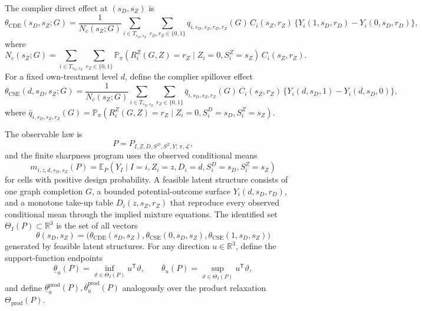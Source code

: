 \documentclass[11pt]{article}
\newcommand{\E}{\mathbb{E}}
\renewcommand{\Pr}{\mathbb{P}}
\newcommand{\transpose}{\mathsf{T}}
\newcommand{\R}{\mathbb{R}}
\theoremstyle{definition}
\theoremstyle{plain}
\theoremstyle{remark}
\begin{document}
The complier direct effect at \((s_D,s_Z)\) is
\[
\theta_{\mathrm{CDE}}(s_D,s_Z;G)
=
\frac{1}{N_c(s_Z;G)}
\sum_{i\in T_{s_D,s_Z}}
\sum_{r_D,r_Z\in\{0,1\}}
q_{i,s_D,s_Z,r_D,r_Z}(G)\,
C_i(s_Z,r_Z)\,
\{Y_i(1,s_D,r_D)-Y_i(0,s_D,r_D)\},
\]
where
\[
N_c(s_Z;G)=
\sum_{i\in T_{s_D,s_Z}}
\sum_{r_Z\in\{0,1\}}
\Pr_\pi(R_i^Z(G,Z)=r_Z\mid Z_i=0,S_i^Z=s_Z)\,C_i(s_Z,r_Z).
\]
For a fixed own-treatment level \(d\), define the complier spillover effect
\[
\theta_{\mathrm{CSE}}(d,s_D,s_Z;G)
=
\frac{1}{N_c(s_Z;G)}
\sum_{i\in T_{s_D,s_Z}}
\sum_{r_Z\in\{0,1\}}
\bar q_{i,s_D,s_Z,r_Z}(G)\,
C_i(s_Z,r_Z)\,
\{Y_i(d,s_D,1)-Y_i(d,s_D,0)\},
\]
where \(\bar q_{i,s_D,s_Z,r_Z}(G)=\Pr_\pi(R_i^Z(G,Z)=r_Z\mid Z_i=0,S_i^D=s_D,S_i^Z=s_Z)\).

The observable law is
\[
P=P_{I,Z,D,S^D,S^Z,Y;\,\pi,\mathcal L},
\]
and the finite sharpness program uses the observed conditional means
\[
m_{i,z,d,s_D,s_Z}(P)=
\E_P(Y_I\mid I=i,Z_i=z,D_i=d,S_i^D=s_D,S_i^Z=s_Z)
\]
for cells with positive design probability. A feasible latent structure consists of one graph completion \(G\), a bounded potential-outcome surface \(Y_i(d,s_D,r_D)\), and a monotone take-up table \(D_i(z,s_Z,r_Z)\) that reproduce every observed conditional mean through the implied mixture equations.
The identified set \(\Theta_I(P)\subset\R^3\) is the set of all vectors
\[
\theta(s_D,s_Z)=\big(\theta_{\mathrm{CDE}}(s_D,s_Z),\theta_{\mathrm{CSE}}(0,s_D,s_Z),\theta_{\mathrm{CSE}}(1,s_D,s_Z)\big)
\]
generated by feasible latent structures. For any direction \(u\in\R^3\), define the support-function endpoints
\[
\underline\theta_u(P)=\inf_{\vartheta\in\Theta_I(P)}u^\transpose\vartheta,
\qquad
\overline\theta_u(P)=\sup_{\vartheta\in\Theta_I(P)}u^\transpose\vartheta,
\]
and define \(\underline\theta^{\mathrm{prod}}_u(P),\overline\theta^{\mathrm{prod}}_u(P)\) analogously over the product relaxation \(\Theta_{\mathrm{prod}}(P)\).
\end{document}
